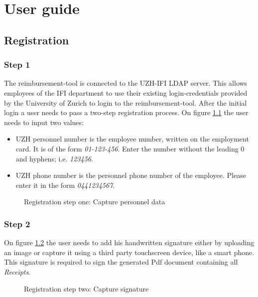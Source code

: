     \chapter{User guide}

\section{Registration}
\label{sec:registration}

\subsection{Step 1}
The reimbursement-tool is connected to the UZH-IFI LDAP server. This allows employees of the IFI department to use their existing login-credentials provided by the University of Zurich to login to the reimbursement-tool.\newline
After the initial login a user needs to pass a two-step registration process. On figure \ref{fig:registration-step01} the user needs to input two values:
\begin{itemize}
    \item UZH personnel number is the employee number, written on the employment card. It is of the form \textit{01-123-456}. Enter the number without the leading 0 and hyphens; i.e. \textit{123456}.
    \item UZH phone number is the personnel phone number of the employee. Please enter it in the form \textit{0441234567}.
\end{itemize}\newpage


\begin{figure}[H]
    \centering
    \caption{Registration step one: Capture personnel data}
    \label{fig:registration-step01}
\end{figure}

\subsection{Step 2}
On figure \ref{fig:registration-step02} the user needs to add his handwritten signature either by uploading an image or capture it using a third party touchscreen device, like a smart phone. This signature is required to sign the generated Pdf document containing all \textit{Receipts}.

\begin{figure}[H]
    \centering
    \caption{Registration step two: Capture signature}
    \label{fig:registration-step02}
\end{figure}

